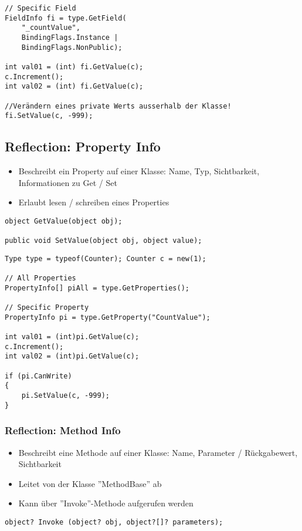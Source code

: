 \begin{multicols*}{2}
\begin{lstlisting}
// Specific Field
FieldInfo fi = type.GetField(
    "_countValue", 
    BindingFlags.Instance | 
    BindingFlags.NonPublic);
  
int val01 = (int) fi.GetValue(c);
c.Increment();
int val02 = (int) fi.GetValue(c);

//Verändern eines private Werts ausserhalb der Klasse!
fi.SetValue(c, -999); 
\end{lstlisting}

\subsection{Reflection: Property Info}
\begin{itemize}
    \item Beschreibt ein Property auf einer Klasse: Name, Typ, Sichtbarkeit, Informationen zu Get / Set
    \item Erlaubt lesen / schreiben eines Properties
\end{itemize}
\begin{lstlisting}
object GetValue(object obj);
    
public void SetValue(object obj, object value);
\end{lstlisting}
\begin{lstlisting}
Type type = typeof(Counter); Counter c = new(1);

// All Properties
PropertyInfo[] piAll = type.GetProperties();

// Specific Property
PropertyInfo pi = type.GetProperty("CountValue");

int val01 = (int)pi.GetValue(c); 
c.Increment();
int val02 = (int)pi.GetValue(c);

if (pi.CanWrite)
{
    pi.SetValue(c, -999);
}
\end{lstlisting}

\subsubsection{Reflection: Method Info}
\begin{itemize}
    \item Beschreibt eine Methode auf einer Klasse: Name, Parameter / Rückgabewert, Sichtbarkeit
    \item Leitet von der Klasse ''MethodBase'' ab
    \item Kann über ''Invoke''-Methode aufgerufen werden
\end{itemize}
\begin{lstlisting}
object? Invoke (object? obj, object?[]? parameters);
\end{lstlisting}

\end{multicols*}
